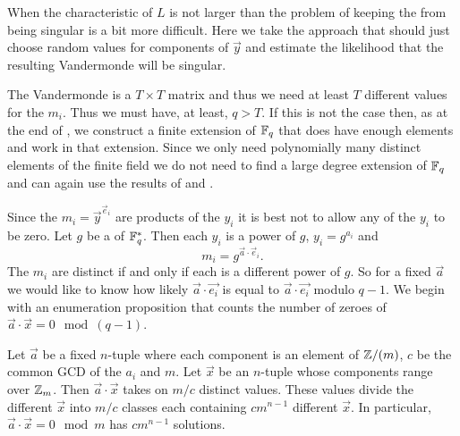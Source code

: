 When the characteristic of $L$ is not larger than  
the problem of keeping the  from being singular is a 
bit more difficult.  Here we take the approach that  should 
just choose random values for components of $\vec{y}$ and estimate the 
likelihood that the resulting Vandermonde will be singular. 

The Vandermonde is a $T \times T$ matrix and thus we need at
least $T$ different values for the $m_i$.  Thus we must have, at
least, $q > T$.  If this is not the case then, as at the end of
, we construct a finite extension
of $\mathbb{F}_q$ that does have enough elements and work in that extension.
Since we only need polynomially many distinct elements of the
finite field we do not need to find a large degree extension of
$\mathbb{F}_q$ and can again use the results of {\Adleman} and {\LenstraH}
\cite{Adleman86}. 

Since the $m_i = \vec{y}^{\vec{e}_i}$ are products of the $y_i$ it is
best not to allow any of the $y_i$ to be zero.  Let $g$ be a
 of $\mathbb{F}^{\ast}_q$.  Then each $y_i$ is a power of
$g$, $y_i = g^{a_i}$ and 
\[
m_i = g^{\vec{a}\cdot \vec{e}_i}.
\]
The $m_i$ are distinct if and only if each is a different power of
$g$.  So for a fixed $\vec{a}$ we would like to know how likely
$\vec{a} \cdot \vec{e_i}$ is equal to $\vec{a} \cdot \vec{e_i}$ modulo
$q-1$.  We begin with an enumeration proposition that counts the
number of zeroes of $\vec{a} \cdot \vec{x} = 0 \mod{(q-1)}$.

\begin{proposition} \label{SPMod:Count:Solns:Prop}
Let $\vec a$ be a fixed $n$-tuple where each component is
an element of $\mathbb{Z}/(m)$, $c$ be the common GCD of the $a_i$ and
$m$.  Let $\vec x$ be an $n$-tuple whose components range over $\mathbb{Z}_m$.  Then
$\vec a \cdot \vec x$ takes on $m/c$ distinct values.  These values
divide the different $\vec x$ into $m/c$ classes each containing $c
m^{n-1}$ different $\vec x$.  In particular, $\vec{a} \cdot \vec{x} =
0 \mod{m}$ has $c m^{n-1}$ solutions.
\end{proposition}


